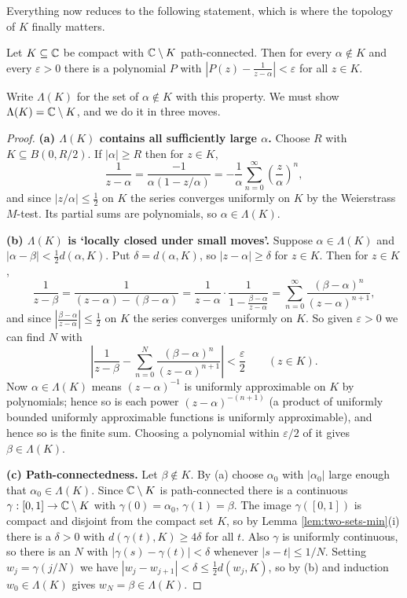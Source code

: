 \documentclass[a4paper]{scrartcl}
\begin{document}
Everything now reduces to the following statement, which is where the topology of $K$ finally matters.

\begin{lemma}\label{lem:runge-pole-poly}
	Let $K\subseteq\mathbb{C}$ be compact with $\mathbb{C}\setminus K$ path-connected. Then for every $\alpha\notin K$ and every $\varepsilon>0$ there is a polynomial $P$ with $\left|P(z)-\frac{1}{z-\alpha}\right|<\varepsilon$ for all $z\in K$.
\end{lemma}

Write $\Lambda(K)$ for the set of $\alpha \notin K$ with this property. We must show $\Lambda(K) = \mathbb{C}\setminus K$, and we do it in three moves.

\begin{proof}
	\textbf{(a) $\Lambda(K)$ contains all sufficiently large $\alpha$.} Choose $R$ with $K\subseteq B(0,R/2)$. If $|\alpha|\geq R$ then for $z \in K$,
	$$\frac{1}{z-\alpha} = \frac{-1}{\alpha(1-z/\alpha)} = -\frac1\alpha\sum_{n=0}^\infty\left(\frac z\alpha\right)^n,$$
	and since $|z/\alpha|\leq\frac12$ on $K$ the series converges uniformly on $K$ by the Weierstrass $M$-test. Its partial sums are polynomials, so $\alpha\in\Lambda(K)$.

	\textbf{(b) $\Lambda(K)$ is `locally closed under small moves'.} Suppose $\alpha\in\Lambda(K)$ and $|\alpha-\beta|<\tfrac12 d(\alpha,K)$. Put $\delta = d(\alpha,K)$, so $|z-\alpha|\geq\delta$ for $z\in K$. Then for $z \in K$,
	$$\frac{1}{z-\beta} = \frac{1}{(z-\alpha)-(\beta-\alpha)} = \frac{1}{z-\alpha}\cdot\frac{1}{1-\frac{\beta-\alpha}{z-\alpha}} = \sum_{n=0}^\infty\frac{(\beta-\alpha)^n}{(z-\alpha)^{n+1}},$$
	and since $\left|\frac{\beta-\alpha}{z-\alpha}\right|\leq\frac12$ on $K$ the series converges uniformly on $K$. So given $\varepsilon>0$ we can find $N$ with
	$$\left|\frac{1}{z-\beta}-\sum_{n=0}^N\frac{(\beta-\alpha)^n}{(z-\alpha)^{n+1}}\right| < \frac\varepsilon2 \qquad (z \in K).$$
	Now $\alpha\in\Lambda(K)$ means $(z-\alpha)^{-1}$ is uniformly approximable on $K$ by polynomials; hence so is each power $(z-\alpha)^{-(n+1)}$ (a product of uniformly bounded uniformly approximable functions is uniformly approximable), and hence so is the finite sum. Choosing a polynomial within $\varepsilon/2$ of it gives $\beta\in\Lambda(K)$.

	\textbf{(c) Path-connectedness.} Let $\beta\notin K$. By (a) choose $\alpha_0$ with $|\alpha_0|$ large enough that $\alpha_0 \in \Lambda(K)$. Since $\mathbb{C}\setminus K$ is path-connected there is a continuous $\gamma:[0,1]\to\mathbb{C}\setminus K$ with $\gamma(0)=\alpha_0$, $\gamma(1)=\beta$. The image $\gamma([0,1])$ is compact and disjoint from the compact set $K$, so by Lemma \ref{lem:two-sets-min}(i) there is a $\delta>0$ with $d(\gamma(t),K)\geq 4\delta$ for all $t$. Also $\gamma$ is uniformly continuous, so there is an $N$ with $|\gamma(s)-\gamma(t)|<\delta$ whenever $|s-t|\leq 1/N$. Setting $w_j = \gamma(j/N)$ we have $|w_j - w_{j+1}| < \delta \leq \tfrac12 d(w_j,K)$, so by (b) and induction $w_0\in\Lambda(K)$ gives $w_N = \beta\in\Lambda(K)$.
\end{proof}
\end{document}
